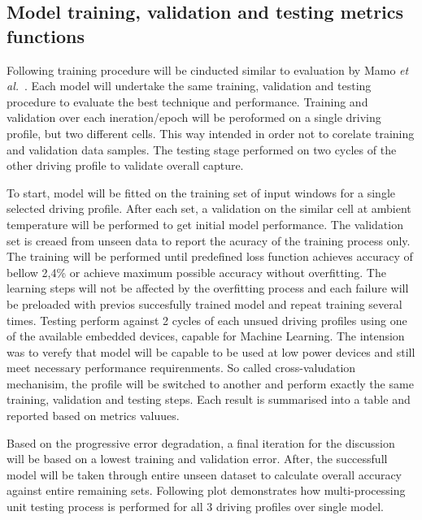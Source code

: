 \subsection{Model training, validation and testing metrics functions}
Following training procedure will be cinducted similar to evaluation by Mamo \textit{et al.}~\cite{mamo_long_2020}.
Each model will undertake the same training, validation and testing procedure to evaluate the best technique and performance.
Training and validation over each ineration/epoch will be peroformed on a single driving profile, but two different cells.
This way intended in order not to corelate training and validation data samples.
The testing stage performed on two cycles of the other driving profile to validate overall capture.

%
%
To start, model will be fitted on the training set of input windows for a single selected driving profile.
After each set, a validation on the similar cell at ambient temperature will be performed to get initial model performance.
The validation set is creaed from unseen data to report the acuracy of the training process only.
The training will be performed until predefined loss function achieves accuracy of bellow 2,4\% or achieve maximum possible accuracy without overfitting.
The learning steps will not be affected by the overfitting process and each failure will be preloaded with previos succesfully trained model and repeat training several times.
%
Testing perform against 2 cycles of each unsued driving profiles using one of the available embedded devices, capable for Machine Learning.
The intension was to verefy that model will be capable to be used at low power devices and still meet necessary performance requirenments.
%
So called cross-valudation mechanisim, the profile will be switched to another and perform exactly the same training, validation and testing steps.
Each result is summarised into a table and reported based on metrics valuues.

Based on the progressive error degradation, a final iteration for the discussion will be based on a lowest training and validation error.
After, the successfull model will be taken through entire unseen dataset to calculate overall accuracy against entire remaining sets.
Following plot demonstrates how multi-processing unit testing process is performed for all 3 driving profiles over single model. 

